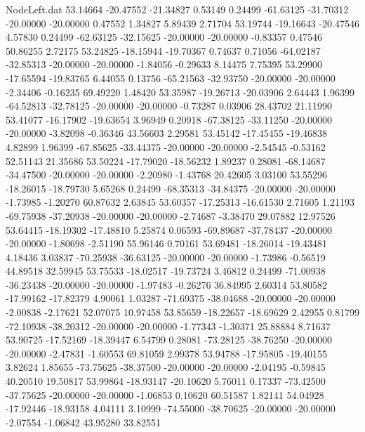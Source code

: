 \begin{filecontents}{NodeLeft.dat}
  53.14664  -20.47552  -21.34827     0.53149    0.24499  -61.63125  -31.70312  -20.00000  -20.00000    0.47552    1.34827    5.89439    2.71704
  53.19744  -19.16643  -20.47546     4.57830    0.24499  -62.63125  -32.15625  -20.00000  -20.00000   -0.83357    0.47546   50.86255    2.72175
  53.24825  -18.15944  -19.70367     0.74637    0.71056  -64.02187  -32.85313  -20.00000  -20.00000   -1.84056   -0.29633    8.14475    7.75395
  53.29900  -17.65594  -19.83765     6.44055    0.13756  -65.21563  -32.93750  -20.00000  -20.00000   -2.34406   -0.16235   69.49220    1.48420
  53.35987  -19.26713  -20.03906     2.64443    1.96399  -64.52813  -32.78125  -20.00000  -20.00000   -0.73287    0.03906   28.43702   21.11990
  53.41077  -16.17902  -19.63654     3.96949    0.20918  -67.38125  -33.11250  -20.00000  -20.00000   -3.82098   -0.36346   43.56603    2.29581
  53.45142  -17.45455  -19.46838     4.82899    1.96399  -67.85625  -33.44375  -20.00000  -20.00000   -2.54545   -0.53162   52.51143   21.35686
  53.50224  -17.79020  -18.56232     1.89237    0.28081  -68.14687  -34.47500  -20.00000  -20.00000   -2.20980   -1.43768   20.42605    3.03100
  53.55296  -18.26015  -18.79730     5.65268    0.24499  -68.35313  -34.84375  -20.00000  -20.00000   -1.73985   -1.20270   60.87632    2.63845
  53.60357  -17.25313  -16.61530     2.71605    1.21193  -69.75938  -37.20938  -20.00000  -20.00000   -2.74687   -3.38470   29.07882   12.97526
  53.64415  -18.19302  -17.48810     5.25874    0.06593  -69.89687  -37.78437  -20.00000  -20.00000   -1.80698   -2.51190   55.96146    0.70161
  53.69481  -18.26014  -19.43481     4.18436    3.03837  -70.25938  -36.63125  -20.00000  -20.00000   -1.73986   -0.56519   44.89518   32.59945
  53.75533  -18.02517  -19.73724     3.46812    0.24499  -71.00938  -36.23438  -20.00000  -20.00000   -1.97483   -0.26276   36.84995    2.60314
  53.80582  -17.99162  -17.82379     4.90061    1.03287  -71.69375  -38.04688  -20.00000  -20.00000   -2.00838   -2.17621   52.07075   10.97458
  53.85659  -18.22657  -18.69629     2.42955    0.81799  -72.10938  -38.20312  -20.00000  -20.00000   -1.77343   -1.30371   25.88884    8.71637
  53.90725  -17.52169  -18.39447     6.54799    0.28081  -73.28125  -38.76250  -20.00000  -20.00000   -2.47831   -1.60553   69.81059    2.99378
  53.94788  -17.95805  -19.40155     3.82624    1.85655  -73.75625  -38.37500  -20.00000  -20.00000   -2.04195   -0.59845   40.20510   19.50817
  53.99864  -18.93147  -20.10620     5.76011    0.17337  -73.42500  -37.75625  -20.00000  -20.00000   -1.06853    0.10620   60.51587    1.82141
  54.04928  -17.92446  -18.93158     4.04111    3.10999  -74.55000  -38.70625  -20.00000  -20.00000   -2.07554   -1.06842   43.95280   33.82551

\end{filecontents}
